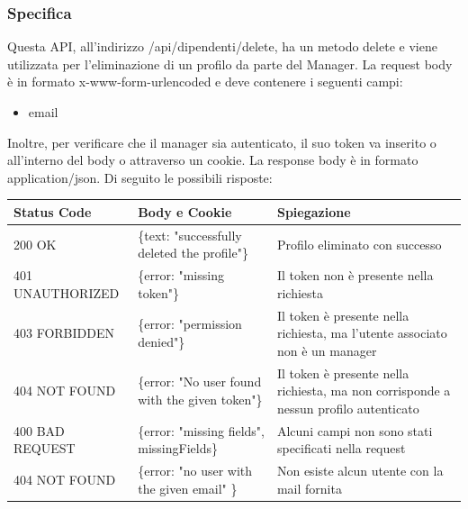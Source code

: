 \documentclass{report}
\begin{document}
\subsubsection*{Specifica}
Questa API, all'indirizzo /api/dipendenti/delete, ha un metodo delete e viene utilizzata per l'eliminazione di un profilo da parte del Manager.
La request body è in formato x-www-form-urlencoded e deve contenere i seguenti campi:
\begin{itemize}
	\item email
\end{itemize}
Inoltre, per verificare che il manager sia autenticato, il suo token va inserito o all'interno del body o attraverso un cookie.
La response body è in formato application/json. Di seguito le possibili risposte:
\begin{center} %
	\centering
	\begin{tabular}{ |p{4cm}|p{5cm}|p{4cm}| }
		\hline
		\centering Status Code & \qquad\quad Body e Cookie                       & \qquad\qquad Spiegazione                                                             \\ %
		\hline
		200 OK                 & \{text: "successfully deleted the profile"\}    & Profilo eliminato con successo                                                       \\
		\hline
		401 UNAUTHORIZED       & \{error: "missing token"\}                      & Il token non è presente nella richiesta                                              \\
		\hline
		403 FORBIDDEN          & \{error: "permission denied"\}                  & Il token è presente nella richiesta, ma l'utente associato non è un manager          \\
		\hline
		404 NOT FOUND          & \{error: "No user found with the given token"\} & Il token è presente nella richiesta, ma non corrisponde a nessun profilo autenticato \\
		\hline
		400 BAD REQUEST        & \{error: "missing fields", missingFields\}      & Alcuni campi non sono stati specificati nella request                                \\ %
		\hline
		404 NOT FOUND          & \{error: "no user with the given email" \}      & Non esiste alcun utente con la mail fornita                                          \\
		\hline
	\end{tabular}
\end{center}
\end{document}
